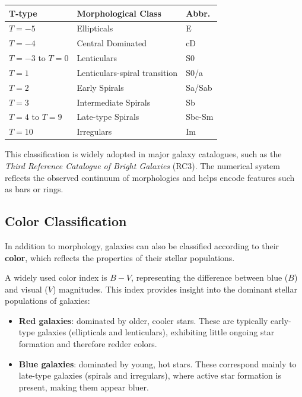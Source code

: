\begin{center}
\begin{tabular}{lll}
    \small
\textbf{T-type} & \textbf{Morphological Class} & \textbf{Abbr.}\\
\hline
$T = -5$ & Ellipticals & E \\
$T = -4$ & Central Dominated & cD \\
$T = -3$ to $T = 0$ & Lenticulars & S0 \\
$T = 1$ & Lenticulars-spiral transition & S0/a \\
$T = 2$ & Early Spirals & Sa/Sab \\
$T = 3$ & Intermediate Spirals & Sb \\
$T = 4$ to $T = 9$ & Late-type Spirals & Sbc-Sm \\
$T = 10$ & Irregulars & Im \\
\end{tabular}
\end{center}

\medskip

This classification is widely adopted in major galaxy catalogues, such as the \textit{Third Reference Catalogue of Bright Galaxies} (RC3). The numerical system reflects the observed continuum of morphologies and helps encode features such as bars or rings.

\subsection{Color Classification}

In addition to morphology, galaxies can also be classified according to their \textbf{color}, which reflects the properties of their stellar populations.

A widely used color index is $B-V$, representing the difference between blue ($B$) and visual ($V$) magnitudes. This index provides insight into the dominant stellar populations of galaxies:

\begin{itemize}
    \item \textbf{Red galaxies}: dominated by older, cooler stars. These are typically early-type galaxies (ellipticals and lenticulars), exhibiting little ongoing star formation and therefore redder colors.
    \item \textbf{Blue galaxies}: dominated by young, hot stars. These correspond mainly to late-type galaxies (spirals and irregulars), where active star formation is present, making them appear bluer.
\end{itemize}

